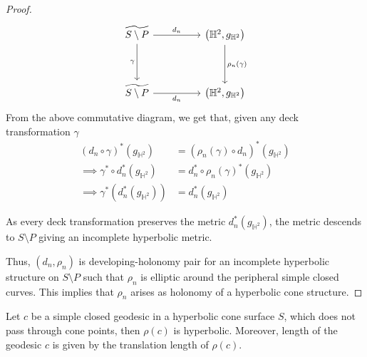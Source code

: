 \begin{proof}
	\[\begin{tikzcd}
		{\widetilde{S \setminus P}} && {\left(\mathbb{H}^2,g_{\mathbb{H}^2}\right)} \\
		\\
		{\widetilde{S \setminus P}} && {\left(\mathbb{H}^2,g_{\mathbb{H}^2}\right)}
		\arrow["{d_n}", from=1-1, to=1-3]
		\arrow["{d_n}"', from=3-1, to=3-3]
		\arrow["\gamma"', from=1-1, to=3-1]
		\arrow["{\rho_n(\gamma)}", from=1-3, to=3-3]
	\end{tikzcd}\]
	From the above commutative diagram, we get that, given any deck transformation $\gamma$
	\begin{align*}
		(d_n \circ \gamma)^\ast (g_{\mathbb{H}^2}) &= (\rho_n(\gamma) \circ d_n)^\ast(g_{\mathbb{H}^2}) \\
		\implies \gamma^\ast \circ d_n^\ast (g_{\mathbb{H}^2}) &=d_n^\ast \circ \rho_n(\gamma)^\ast (g_{\mathbb{H}^2}) \\ 
		\implies \gamma^\ast(d_n^\ast(g_{\mathbb{H}^2})) &= d_n^\ast(g_{\mathbb{H}^2})
	\end{align*}
	
	As every deck transformation preserves the metric $d_n^\ast(g_{\mathbb{H}^2})$, the metric descends to $S \setminus P$ giving an incomplete hyperbolic metric.
	
	Thus, $(d_n, \rho_n)$ is developing-holonomy pair for an incomplete hyperbolic structure on $S \setminus P$ such that $\rho_n$ is elliptic around the peripheral simple closed curves. This implies that $\rho_n$ arises as holonomy of a hyperbolic cone structure.
\end{proof}

\begin{prop} \label{prop:holonomy_of_geodesics}
	Let $c$ be a simple closed geodesic in a hyperbolic cone surface $S$, which does not pass through cone points, then $\rho(c)$ is hyperbolic. Moreover, length of the geodesic $c$ is given by the translation length of $\rho(c)$.
\end{prop}

